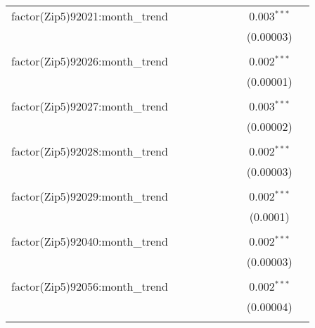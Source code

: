 \begin{table}[H]
{\begin{tabular}{@{\extracolsep{5pt}}lcccccccc}
  factor(Zip5)92021:month\_trend &  &  &  &  &  &  & 0.003$^{***}$ &  \\  

   &  &  &  &  &  &  & (0.00003) &  \\  

   & & & & & & & & \\  

  factor(Zip5)92026:month\_trend &  &  &  &  &  &  & 0.002$^{***}$ &  \\  

   &  &  &  &  &  &  & (0.00001) &  \\  

   & & & & & & & & \\  

  factor(Zip5)92027:month\_trend &  &  &  &  &  &  & 0.003$^{***}$ &  \\  

   &  &  &  &  &  &  & (0.00002) &  \\  

   & & & & & & & & \\  

  factor(Zip5)92028:month\_trend &  &  &  &  &  &  & 0.002$^{***}$ &  \\  

   &  &  &  &  &  &  & (0.00003) &  \\  

   & & & & & & & & \\  

  factor(Zip5)92029:month\_trend &  &  &  &  &  &  & 0.002$^{***}$ &  \\  

   &  &  &  &  &  &  & (0.0001) &  \\  

   & & & & & & & & \\  

  factor(Zip5)92040:month\_trend &  &  &  &  &  &  & 0.002$^{***}$ &  \\  

   &  &  &  &  &  &  & (0.00003) &  \\  

   & & & & & & & & \\  

  factor(Zip5)92056:month\_trend &  &  &  &  &  &  & 0.002$^{***}$ &  \\  

   &  &  &  &  &  &  & (0.00004) &  \\  

   & & & & & & & & \\  


\end{tabular}}
\end{table}
